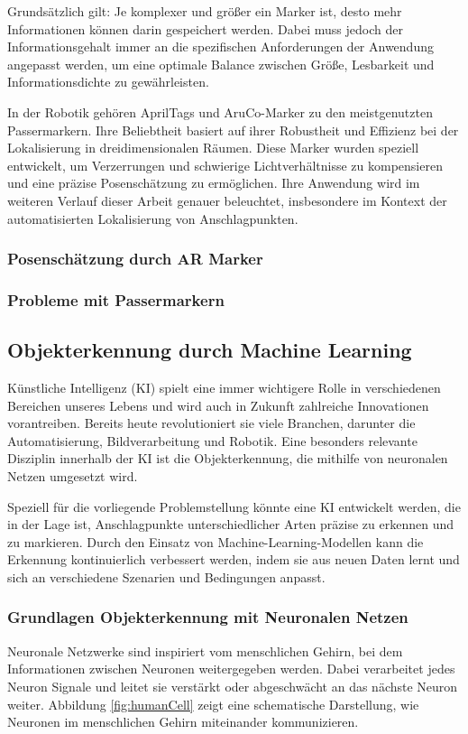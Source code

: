 Grundsätzlich gilt: Je komplexer und größer ein Marker ist, desto mehr Informationen können
darin gespeichert werden. Dabei muss jedoch der Informationsgehalt immer an die spezifischen 
Anforderungen der Anwendung angepasst werden, um eine optimale Balance zwischen Größe, Lesbarkeit 
und Informationsdichte zu gewährleisten.

In der Robotik gehören AprilTags und AruCo-Marker zu den meistgenutzten Passermarkern. 
Ihre Beliebtheit basiert auf ihrer Robustheit und Effizienz bei der Lokalisierung in 
dreidimensionalen Räumen. Diese Marker wurden speziell entwickelt, um Verzerrungen und 
schwierige Lichtverhältnisse zu kompensieren und eine präzise Posenschätzung zu ermöglichen. 
Ihre Anwendung wird im weiteren Verlauf dieser Arbeit genauer beleuchtet, insbesondere im 
Kontext der automatisierten Lokalisierung von Anschlagpunkten.


\subsubsection{Posenschätzung durch AR Marker}


\subsubsection{Probleme mit Passermarkern}



\subsection{Objekterkennung durch Machine Learning}
Künstliche Intelligenz (KI) spielt eine immer wichtigere Rolle in verschiedenen Bereichen 
unseres Lebens und wird auch in Zukunft zahlreiche Innovationen vorantreiben. 
Bereits heute revolutioniert sie viele Branchen, darunter die Automatisierung, 
Bildverarbeitung und Robotik. Eine besonders relevante Disziplin innerhalb der KI ist die 
Objekterkennung, die mithilfe von neuronalen Netzen umgesetzt wird.

Speziell für die vorliegende Problemstellung könnte eine KI entwickelt werden, die in der 
Lage ist, Anschlagpunkte unterschiedlicher Arten präzise zu erkennen und zu markieren. 
Durch den Einsatz von Machine-Learning-Modellen kann die Erkennung kontinuierlich verbessert 
werden, indem sie aus neuen Daten lernt und sich an verschiedene Szenarien und Bedingungen 
anpasst.

\subsubsection{Grundlagen Objekterkennung mit Neuronalen Netzen}
Neuronale Netzwerke sind inspiriert vom menschlichen Gehirn, bei dem Informationen zwischen Neuronen weitergegeben 
werden. Dabei verarbeitet jedes Neuron Signale und leitet sie verstärkt oder abgeschwächt an das nächste Neuron weiter.
Abbildung \ref{fig:humanCell} zeigt eine schematische Darstellung, wie Neuronen im menschlichen Gehirn miteinander 
kommunizieren.

